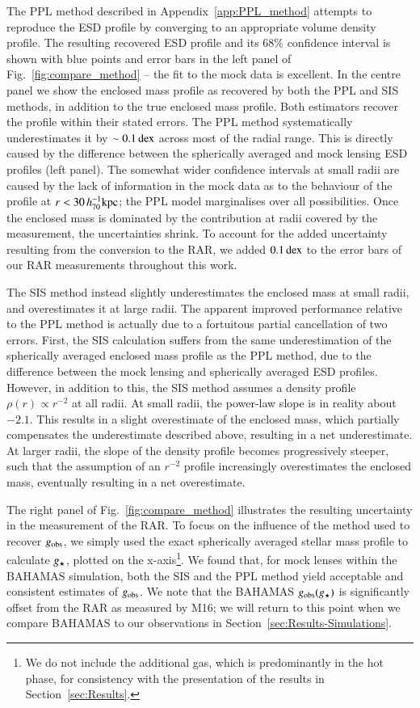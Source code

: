 \documentclass{aa}
\newcommand{\hkpc}{\,h_{70}^{-1}{\rm{kpc}} }
\newcommand{\dex}{\,{\rm dex}}
\newcommand{\un}[1]{_{\rm #1}}
\begin{document}
The PPL method described in Appendix~\ref{app:PPL_method} attempts to reproduce the ESD profile by converging to an appropriate volume density profile. The resulting recovered ESD profile and its $68\%$ confidence interval is shown with blue points and error bars in the left panel of Fig.~\ref{fig:compare_method} -- the fit to the mock data is excellent. In the centre panel we show the enclosed mass profile as recovered by both the PPL and SIS methods, in addition to the true enclosed mass profile. Both estimators recover the profile within their stated errors. The PPL method systematically underestimates it by $\sim 0.1 \dex$ across most of the radial range. This is directly caused by the difference between the spherically averaged and mock lensing ESD profiles (left panel). The somewhat wider confidence intervals at small radii are caused by the lack of information in the mock data as to the behaviour of the profile at $r < 30 \hkpc$; the PPL model marginalises over all possibilities. Once the enclosed mass is dominated by the contribution at radii covered by the measurement, the uncertainties shrink. To account for the added uncertainty resulting from the conversion to the RAR, we added $0.1 \dex$ to the error bars of our RAR measurements throughout this work.

The SIS method instead slightly underestimates the enclosed mass at small radii, and overestimates it at large radii. The apparent improved performance relative to the PPL method is actually due to a fortuitous partial cancellation of two errors. First, the SIS calculation suffers from the same underestimation of the spherically averaged enclosed mass profile as the PPL method, due to the difference between the mock lensing and spherically averaged ESD profiles. However, in addition to this, the SIS method assumes a density profile $\rho(r)\propto r^{-2}$ at all radii. At small radii, the power-law slope is in reality about $-2.1$. This results in a slight overestimate of the enclosed mass, which partially compensates the underestimate described above, resulting in a net underestimate. At larger radii, the slope of the density profile becomes progressively steeper, such that the assumption of an $r^{-2}$ profile increasingly overestimates the enclosed mass, eventually resulting in a net overestimate.

The right panel of Fig.~\ref{fig:compare_method} illustrates the resulting uncertainty in the measurement of the RAR. To focus on the influence of the method used to recover $g\un{obs}$, we simply used the exact spherically averaged stellar mass profile to calculate $g\un{\star}$, plotted on the x-axis\footnote{We do not include the additional gas, which is predominantly in the hot phase, for consistency with the presentation of the results in Section~\ref{sec:Results}.}. We found that, for mock lenses within the BAHAMAS simulation, both the SIS and the PPL method yield acceptable and consistent estimates of $g\un{obs}$. We note that the BAHAMAS $g\un{obs}(g\un{\star})$ is significantly offset from the RAR as measured by M16; we will return to this point when we compare BAHAMAS to our observations in Section~\ref{sec:Results-Simulations}.
\end{document}
